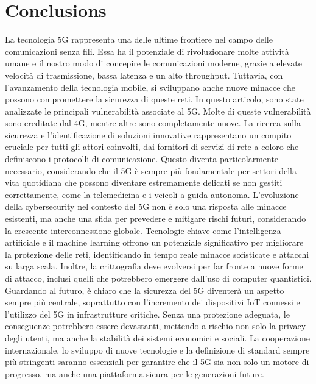 \documentclass[english]{article}
\begin{document}
\section{Conclusions}\label{Conclusions}
La tecnologia 5G rappresenta una delle ultime frontiere nel campo delle
comunicazioni senza fili. Essa ha il potenziale di rivoluzionare molte attività
umane e il nostro modo di concepire le comunicazioni moderne, grazie a elevate
velocità di trasmissione, bassa latenza e un alto throughput. Tuttavia, con
l'avanzamento della tecnologia mobile, si sviluppano anche nuove minacce che
possono compromettere la sicurezza di queste reti. In questo articolo, sono
state analizzate le principali vulnerabilità associate al 5G. Molte di queste
vulnerabilità sono ereditate dal 4G, mentre altre sono completamente nuove. La
ricerca sulla sicurezza e l'identificazione di soluzioni innovative
rappresentano un compito cruciale per tutti gli attori coinvolti, dai fornitori
di servizi di rete a coloro che definiscono i protocolli di comunicazione.
Questo diventa particolarmente necessario, considerando che il 5G è sempre più
fondamentale per settori della vita quotidiana che possono diventare
estremamente delicati se non gestiti correttamente, come la telemedicina e i
veicoli a guida autonoma. L’evoluzione della cybersecurity nel contesto del 5G
non è solo una risposta alle minacce esistenti, ma anche una sfida per
prevedere e mitigare rischi futuri, considerando la crescente interconnessione
globale. Tecnologie chiave come l'intelligenza artificiale e il machine
learning offrono un potenziale significativo per migliorare la protezione delle
reti, identificando in tempo reale minacce sofisticate e attacchi su larga
scala. Inoltre, la crittografia deve evolversi per far fronte a nuove forme di
attacco, inclusi quelli che potrebbero emergere dall’uso di computer
quantistici. Guardando al futuro, è chiaro che la sicurezza del 5G diventerà un
aspetto sempre più centrale, soprattutto con l'incremento dei dispositivi IoT
connessi e l’utilizzo del 5G in infrastrutture critiche. Senza una protezione
adeguata, le conseguenze potrebbero essere devastanti, mettendo a rischio non
solo la privacy degli utenti, ma anche la stabilità dei sistemi economici e
sociali. La cooperazione internazionale, lo sviluppo di nuove tecnologie e la
definizione di standard sempre più stringenti saranno essenziali per garantire
che il 5G sia non solo un motore di progresso, ma anche una piattaforma sicura
per le generazioni future.

\clearpage
\appendix
\end{document}

